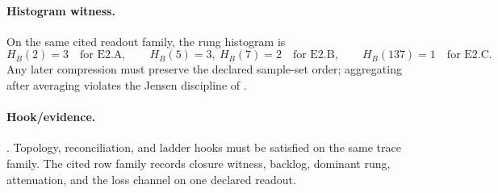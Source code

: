 \paragraph{Histogram witness.} On the same cited readout family, the rung histogram is
\[
H_B(2)=3\quad\text{for E2.A},
\qquad
H_B(5)=3,\ H_B(7)=2\quad\text{for E2.B},
\qquad
H_B(137)=1\quad\text{for E2.C}.
\]
Any later compression must preserve the declared sample-set order; aggregating after averaging violates the Jensen discipline of .

\paragraph{Hook/evidence.} . Topology, reconciliation, and ladder hooks must be satisfied on the same trace family. The cited row family records closure witness, backlog, dominant rung, attenuation, and the loss channel on one declared readout.
